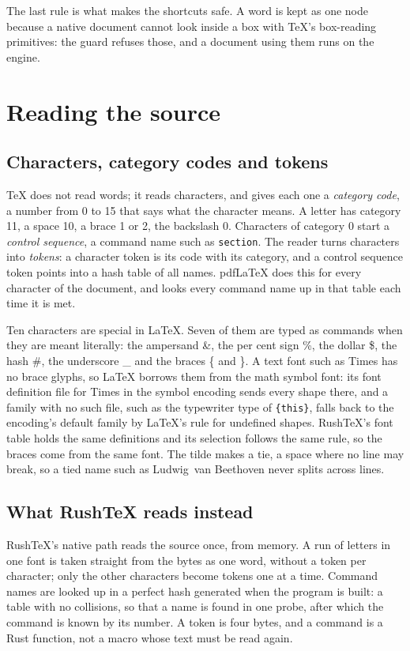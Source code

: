 \documentclass{article}
\numberwithin{equation}{section}
\theoremstyle{definition}
\theoremstyle{remark}
\begin{document}
The last rule is what makes the shortcuts safe. A word is kept as one node because a
native document cannot look inside a box with \TeX's box-reading primitives: the guard
refuses those, and a document using them runs on the engine.

\section{Reading the source}\label{sec:source}

\subsection{Characters, category codes and tokens}

\TeX{} does not read words; it reads characters, and gives each one a \emph{category
code}, a number from 0 to 15 that says what the character means. A letter has category
11, a space 10, a brace 1 or 2, the backslash 0. Characters of category 0 start a
\emph{control sequence}, a command name such as \texttt{section}. The reader turns
characters into \emph{tokens}: a character token is its code with its category, and a
control sequence token points into a hash table of all names. pdfLaTeX does this for
every character of the document, and looks every command name up in that table each
time it is met.

Ten characters are special in \LaTeX. Seven of them are typed as commands when they are
meant literally: the ampersand \&, the per cent sign \%, the dollar \$, the hash \#, the
underscore \_ and the braces \{ and \}. A text font such as Times has no brace glyphs,
so \LaTeX{} borrows them from the math symbol font: its font definition file for Times
in the symbol encoding sends every shape there, and a family with no such file, such
as the typewriter type of \texttt{\{this\}}, falls back to the encoding's default
family by \LaTeX's rule for undefined shapes. RushTeX's font table holds the same
definitions and its selection follows the same rule, so the braces come from the same
font. The tilde makes a tie, a space where no line
may break, so a tied name such as Ludwig~van Beethoven never splits across lines.

\subsection{What RushTeX reads instead}

RushTeX's native path reads the source once, from memory. A run of letters in one font
is taken straight from the bytes as one word, without a token per character; only the
other characters become tokens one at a time. Command names are looked up in a perfect
hash generated when the program is built: a table with no collisions, so that a name is
found in one probe, after which the command is known by its number. A token is four
bytes, and a command is a Rust function, not a macro whose text must be read again.
\end{document}
